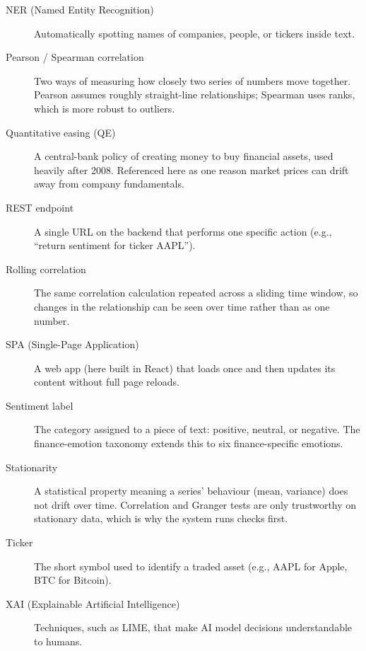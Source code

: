 \begin{description}
\item[NER (Named Entity Recognition)] Automatically spotting names of companies, people, or tickers inside text.

\item[Pearson / Spearman correlation] Two ways of measuring how closely two series of numbers move together. Pearson assumes roughly straight-line relationships; Spearman uses ranks, which is more robust to outliers.

\item[Quantitative easing (QE)] A central-bank policy of creating money to buy financial assets, used heavily after 2008. Referenced here as one reason market prices can drift away from company fundamentals.

\item[REST endpoint] A single URL on the backend that performs one specific action (e.g., ``return sentiment for ticker AAPL'').

\item[Rolling correlation] The same correlation calculation repeated across a sliding time window, so changes in the relationship can be seen over time rather than as one number.

\item[SPA (Single-Page Application)] A web app (here built in React) that loads once and then updates its content without full page reloads.

\item[Sentiment label] The category assigned to a piece of text: positive, neutral, or negative. The finance-emotion taxonomy extends this to six finance-specific emotions.

\item[Stationarity] A statistical property meaning a series' behaviour (mean, variance) does not drift over time. Correlation and Granger tests are only trustworthy on stationary data, which is why the system runs checks first.

\item[Ticker] The short symbol used to identify a traded asset (e.g., AAPL for Apple, BTC for Bitcoin).

\item[XAI (Explainable Artificial Intelligence)] Techniques, such as LIME, that make AI model decisions understandable to humans.

\end{description}
